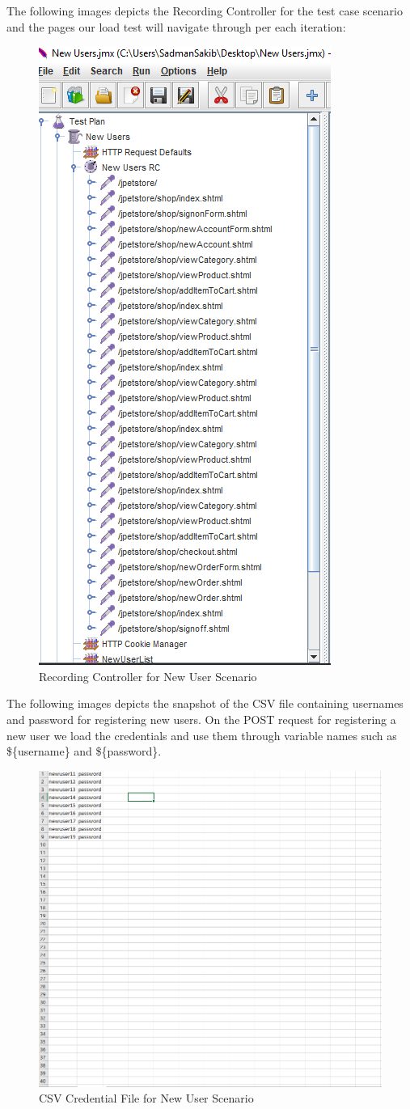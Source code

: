 \documentclass[fontsize=12pt,paper=letter,twoside]{scrartcl}
\begin{document}
\newpage
\bigskip
\noindent The following images depicts the Recording Controller for the test case scenario and the pages our load test will navigate through per each iteration:

\begin{figure}[!htb]
\begin{center}
\includegraphics[width=.5\textwidth]{../../load-test/test-plans/new-user/rc.png}
\end{center}
\caption{Recording Controller for New User Scenario}
\label{fig:ruser:rc}
\end{figure}

\bigskip
\noindent The following images depicts the snapshot of the CSV file containing usernames and password for registering new users. On the POST request for registering a new user we load the credentials and use them through variable names such as \$\{username\} and \$\{password\}.

\begin{figure}[!htb]
\begin{center}
\includegraphics[width=.6\textwidth]{../../load-test/test-plans/new-user/csv.png}
\end{center}
\caption{CSV Credential File for New User Scenario}
\label{fig:ruser:csv}
\end{figure}
\end{document}
